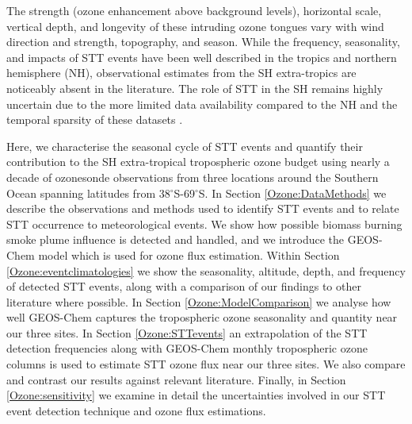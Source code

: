   The strength (ozone enhancement above background levels), horizontal scale, vertical depth, and longevity of these intruding ozone tongues vary with wind direction and strength, topography, and season.
  While the frequency, seasonality, and impacts of STT events have been well described in the tropics and northern hemisphere (NH), observational estimates from the SH extra-tropics are noticeably absent in the literature. 
  The role of STT in the SH remains highly uncertain due to the more limited data availability compared to the NH and the temporal sparsity of these datasets \parencite{Mze2010, Thompson2014, Liu2015}. 
  
  Here, we characterise the seasonal cycle of STT events and quantify their contribution to the SH extra-tropical tropospheric ozone budget using nearly a decade of ozonesonde observations from three locations around the Southern Ocean spanning latitudes from 38$^{\circ}$S-69$^{\circ}$S. 
  In Section \ref{Ozone:DataMethods} we describe the observations and methods used to identify STT events and to relate STT occurrence to meteorological events. 
  We show how possible biomass burning smoke plume influence is detected and handled, and we introduce the GEOS-Chem model which is used for ozone flux estimation.
  Within Section \ref{Ozone:eventclimatologies} we show the seasonality, altitude, depth, and frequency of detected STT events, along with a comparison of our findings to other literature where possible. 
  In Section \ref{Ozone:ModelComparison} we analyse how well GEOS-Chem captures the tropospheric ozone seasonality and quantity near our three sites.
  In Section \ref{Ozone:STTevents} an extrapolation of the STT detection frequencies along with GEOS-Chem monthly tropospheric ozone columns is used to estimate STT ozone flux near our three sites. 
  We also compare and contrast our results against relevant literature. 
  Finally, in Section \ref{Ozone:sensitivity} we examine in detail the uncertainties involved in our STT event detection technique and ozone flux estimations.
  

